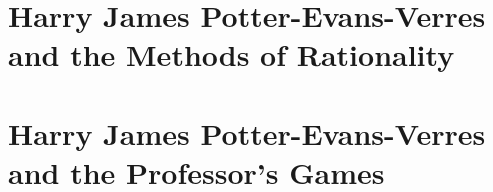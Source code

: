 \RequirePackage[pdf]{layout/hp-book}


{
\pagestyle{empty}






\cleartorecto
}
\setcounter{page}{1}


\part{Harry James Potter-Evans-Verres and the Methods of Rationality}










\setcounter{chapter}{11}










\part{Harry James Potter-Evans-Verres and the Professor's Games}
















